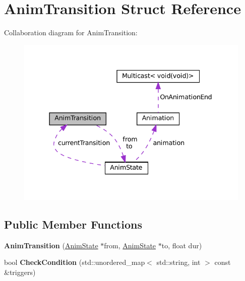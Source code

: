 \hypertarget{structAnimTransition}{}\section{Anim\+Transition Struct Reference}
\label{structAnimTransition}


Collaboration diagram for Anim\+Transition\+:\nopagebreak
\begin{figure}[H]
\begin{center}
\leavevmode
\includegraphics[width=337pt]{structAnimTransition__coll__graph}
\end{center}
\end{figure}
\subsection*{Public Member Functions}
\begin{DoxyCompactItemize}
\item 
\mbox{\label{structAnimTransition_adae6a616bfb3af473694a911f6a454f8}} 
{\bfseries Anim\+Transition} (\hyperlink{structAnimState}{Anim\+State} $\ast$from, \hyperlink{structAnimState}{Anim\+State} $\ast$to, float dur)
\item 
\mbox{\label{structAnimTransition_a3bcab7f4f01efd7ff1fef219353ff7fd}} 
bool {\bfseries Check\+Condition} (std\+::unordered\+\_\+map$<$ std\+::string, int $>$ const \&triggers)
\end{DoxyCompactItemize}
